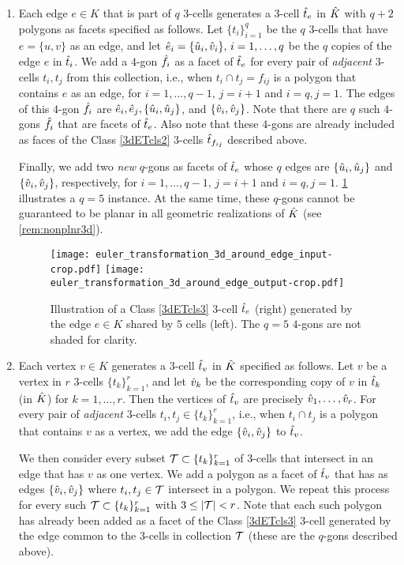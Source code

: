 \begin{enumerate}
  \item \label{3dETcls3}
    Each edge $e \in K$ that is part of $q$ $3$-cells generates a $3$-cell $\hat{t}_e$ in $\hat{K}$ with $q+2$ polygons as facets specified as follows.
    Let $\{t_i\}_{i=1}^q$ be the $q$ $3$-cells that have $e = \{u,v\}$ as an edge, and
    let $\hat{e}_i = \{\hat{u}_i, \hat{v}_i\},\,i=1,\dots,q$ be the $q$ copies of the edge $e$ in $\hat{t}_i$.
    We add a $4$-gon $\hat{f}_i$ as a facet of $\hat{t}_e$ for every pair of \emph{adjacent} $3$-cells $t_i,t_j$ from this collection, i.e., when $t_i \cap t_j = f_{ij}$ is a polygon that contains $e$ as an edge, for $i=1,\dots,q-1,\,j=i+1$ and $i=q,j=1$.
    The edges of this $4$-gon $\hat{f}_i$ are $\hat{e}_i, \hat{e}_j, \{\hat{u}_i, \hat{u}_j\}$, and $\{\hat{v}_i, \hat{v}_j\}$.
    Note that there are $q$ such $4$-gons $\hat{f}_i$ that are facets of $\hat{t}_e$.
    Also note that these $4$-gons are already included as faces of the Class \ref{3dETcls2} $3$-cells $\hat{t}_{f_{ij}}$ described above.

    Finally, we add two \emph{new} $q$-gons as facets of $\hat{t}_e$ whose $q$ edges are $\{\hat{u}_i,\hat{u}_j\}$ and $\{\hat{v}_i,\hat{v}_j\}$, respectively, for  $i=1,\dots,q-1,\,j=i+1$ and $i=q,j=1$.
    \cref{fig:3dETcls3} illustrates a $q=5$ instance.
    At the same time, these $q$-gons cannot be guaranteed to be planar in all geometric realizations of $\hat{K}$ (see \cref{rem:nonplnr3d}). %
    \begin{figure}[htp!]
      \centering
      \texttt{[image: euler\_transformation\_3d\_around\_edge\_input-crop.pdf]}
      \hspace*{0.1in}
      \texttt{[image: euler\_transformation\_3d\_around\_edge\_output-crop.pdf]}
      \caption{Illustration of a Class \ref{3dETcls3} $3$-cell $\hat{t}_e$ (right) generated by the edge $e \in K$ shared by $5$ cells (left).
        The $q=5$ $4$-gons are not shaded for clarity.
      }
        \label{fig:3dETcls3}
    \end{figure}

  \item \label{3dETcls4}
    Each vertex $v \in K$ generates a $3$-cell $\hat{t}_v$ in $\hat{K}$ specified as follows.
    Let $v$ be a vertex in $r$ $3$-cells $\{t_k\}_{k=1}^r$, and let $\hat{v}_k$ be the corresponding copy of $v$ in $\hat{t}_k$ (in $\hat{K}$) for $k=1,\dots,r$.
    Then the vertices of $\hat{t}_v$ are precisely $\hat{v}_1,\dots,\hat{v}_r$.
    For every pair of \emph{adjacent} $3$-cells $t_i,t_j \in \{t_k\}_{k=1}^r$, i.e., when $t_i \cap t_j$ is a polygon that contains $v$ as a vertex, we add the edge $\{\hat{v}_i,\hat{v}_j\}$ to $\hat{t}_v$.

    We then consider every subset $\mathcal{T} \subset \{t_k\}_{k=1}^r$ of $3$-cells that intersect in an edge that has $v$ as one vertex.
    We add a polygon as a facet of $\hat{t}_v$ that has as edges $\{\hat{v}_i,\hat{v}_j\}$ where $t_i,t_j \in \mathcal{T}$ intersect in a polygon.
    We repeat this process for every such $\mathcal{T} \subset \{t_k\}_{k=1}^r$ with $3 \leq |\mathcal{T}| < r$.
    Note that each such polygon has already been added as a facet of the Class \ref{3dETcls3} $3$-cell generated by the edge common to the $3$-cells in collection $\mathcal{T}$ (these are the $q$-gons described above).

\end{enumerate}

